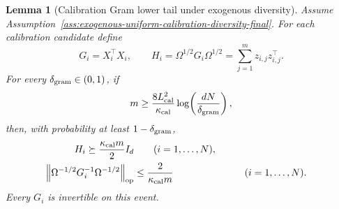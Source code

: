 \documentclass{article} %
\newtheorem{lemma}[theorem]{Lemma}
\begin{document}
\begin{lemma}[Calibration Gram lower tail under exogenous diversity]
\label{lem:calibration-gram-lower-tail-final}
Assume Assumption~\ref{ass:exogenous-uniform-calibration-diversity-final}.  For
each calibration candidate define
\begin{equation}
G_i=X_i^\top X_i,
\qquad
H_i=\Omega^{1/2}G_i\Omega^{1/2}
=
\sum_{j=1}^m z_{i,j}z_{i,j}^{\top}.
\end{equation}
For every \(\delta_{\rm gram}\in(0,1)\), if
\begin{equation}
m
\geq
\frac{8L_{\rm cal}^2}{\kappa_{\rm cal}}
\log\!\left(\frac{dN}{\delta_{\rm gram}}\right),
\end{equation}
then, with probability at least \(1-\delta_{\rm gram}\),
\begin{equation}
\begin{aligned}
H_i\succeq \frac{\kappa_{\rm cal}m}{2}I_d
&\qquad(i=1,\ldots,N),
\\
\left\|\Omega^{-1/2}G_i^{-1}\Omega^{-1/2}\right\|_{\mathrm{op}}
&\leq
\frac{2}{\kappa_{\rm cal}m}
&&\qquad(i=1,\ldots,N).
\end{aligned}
\end{equation}
Every \(G_i\) is invertible on this event.
\end{lemma}
\end{document}
